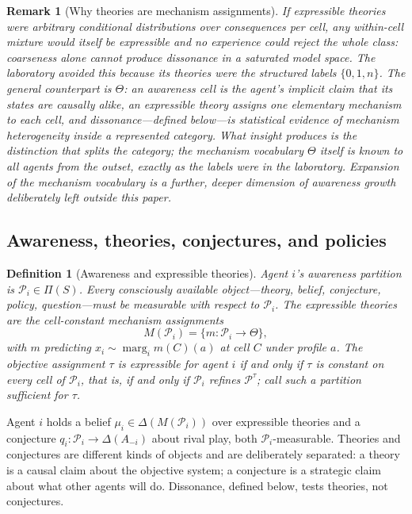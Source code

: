 \documentclass[11pt]{article}
\newtheorem{definition}[assumption]{Definition}
\newtheorem{remark}[assumption]{Remark}
\newcommand{\marg}[1]{\operatorname{marg}_{#1}}
\begin{document}
\begin{remark}[Why theories are mechanism assignments]
\label{rem:why-mechanisms}
If expressible theories were arbitrary conditional distributions over
consequences per cell, any within-cell mixture would itself be expressible
and no experience could reject the whole class: coarseness alone cannot
produce dissonance in a saturated model space.  The laboratory avoided this
because its theories were the structured labels $\{0,1,n\}$.  The general
counterpart is $\Theta$: an awareness cell is the agent's implicit claim that
its states are causally alike, an expressible theory assigns one elementary
mechanism to each cell, and dissonance---defined below---is statistical
evidence of \emph{mechanism heterogeneity inside a represented category}.
What insight produces is the distinction that splits the category; the
mechanism vocabulary $\Theta$ itself is known to all agents from the outset,
exactly as the labels were in the laboratory.  Expansion of the mechanism
vocabulary is a further, deeper dimension of awareness growth deliberately
left outside this paper.
\end{remark}

\subsection{Awareness, theories, conjectures, and policies}
\label{sec:awareness}

\begin{definition}[Awareness and expressible theories]
\label{def:awareness}
Agent $i$'s awareness partition is $\mathcal P_i\in\Pi(S)$.  Every consciously
available object---theory, belief, conjecture, policy, question---must be
measurable with respect to $\mathcal P_i$.  The expressible theories are the
cell-constant mechanism assignments
\begin{equation}
M(\mathcal P_i)=\{m:\mathcal P_i\to\Theta\},
\label{eq:expressible}
\end{equation}
with $m$ predicting $x_i\sim\marg{i}m(C)(a)$ at cell $C$ under profile $a$.
The objective assignment $\tau$ is expressible for agent $i$ if and only if
$\tau$ is constant on every cell of $\mathcal P_i$, that is, if and only if
$\mathcal P_i$ refines $\mathcal P^{\tau}$; call such a partition
\emph{sufficient} for $\tau$.
\end{definition}

Agent $i$ holds a belief $\mu_i\in\Delta(M(\mathcal P_i))$ over expressible
theories and a conjecture $q_i:\mathcal P_i\to\Delta(A_{-i})$ about rival
play, both $\mathcal P_i$-measurable.  Theories and conjectures are different
kinds of objects and are deliberately separated: a theory is a causal claim
about the objective system; a conjecture is a strategic claim about what other
agents will do.  Dissonance, defined below, tests theories, not conjectures.
\end{document}
